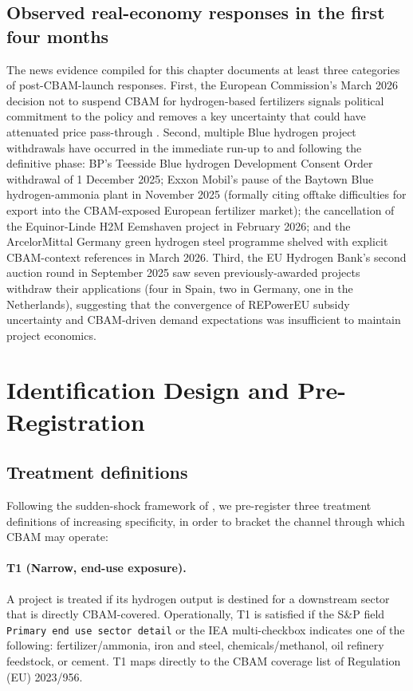 \documentclass[11pt,a4paper]{article}
\begin{document}
\subsection{Observed real-economy responses in the first four months}

The news evidence compiled for this chapter documents at least three categories of post-CBAM-launch responses. First, the European Commission's March 2026 decision not to suspend CBAM for hydrogen-based fertilizers signals political commitment to the policy and removes a key uncertainty that could have attenuated price pass-through \citep{ec2026hydrogen}. Second, multiple Blue hydrogen project withdrawals have occurred in the immediate run-up to and following the definitive phase: BP's Teesside Blue hydrogen Development Consent Order withdrawal of 1 December 2025; Exxon Mobil's pause of the Baytown Blue hydrogen-ammonia plant in November 2025 (formally citing offtake difficulties for export into the CBAM-exposed European fertilizer market); the cancellation of the Equinor-Linde H2M Eemshaven project in February 2026; and the ArcelorMittal Germany green hydrogen steel programme shelved with explicit CBAM-context references in March 2026. Third, the EU Hydrogen Bank's second auction round in September 2025 saw seven previously-awarded projects withdraw their applications (four in Spain, two in Germany, one in the Netherlands), suggesting that the convergence of REPowerEU subsidy uncertainty and CBAM-driven demand expectations was insufficient to maintain project economics.

\section{Identification Design and Pre-Registration}
\label{sec:ch8-identification}

\subsection{Treatment definitions}

Following the sudden-shock framework of \citet{hanemaaijer2024minority}, we pre-register three treatment definitions of increasing specificity, in order to bracket the channel through which CBAM may operate:

\paragraph{T1 (Narrow, end-use exposure).} A project is treated if its hydrogen output is destined for a downstream sector that is directly CBAM-covered. Operationally, T1 is satisfied if the S\&P field \texttt{Primary end use sector detail} or the IEA multi-checkbox indicates one of the following: fertilizer/ammonia, iron and steel, chemicals/methanol, oil refinery feedstock, or cement. T1 maps directly to the CBAM coverage list of Regulation (EU) 2023/956.
\end{document}
